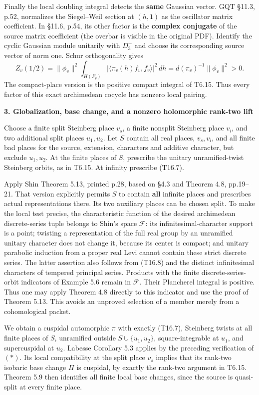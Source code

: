 Finally the local doubling integral detects the \textbf{same} Gaussian vector. GQT §11.3, p.52, normalizes the Siegel--Weil section at \((h,1)\) as the oscillator matrix coefficient. In §11.6, p.54, its other factor is the \textbf{complex conjugate} of the source matrix coefficient (the overbar is visible in the original PDF). Identify the cyclic Gaussian module unitarily with \(D_3^-\) and choose its corresponding source vector of norm one. Schur orthogonality gives \[
Z_v(1/2)=\|\phi_v\|^2\int_{H(F_v)}
       |\langle\pi_v(h)f_v,f_v\rangle|^2\,dh
       =d(\pi_v)^{-1}\|\phi_v\|^2>0.
\tag{T16.9}
\] The compact-place version is the positive compact integral of T6.15. Thus every factor of this exact archimedean cocycle has nonzero local pairing.

\textbf{3. Globalization, base change, and a nonzero holomorphic rank-two lift}

Choose a finite split Steinberg place \(v_s\), a finite nonsplit Steinberg place \(v_i\), and two additional split places \(u_1,u_2\). Let \(S\) contain all real places, \(v_s,v_i\), and all finite bad places for the source, extension, characters and additive character, but exclude \(u_1,u_2\). At the finite places of \(S\), prescribe the unitary unramified-twist Steinberg orbits, as in T6.15. At infinity prescribe (T16.7).

Apply Shin Theorem 5.13, printed p.28, based on §4.3 and Theorem 4.8, pp.19--21. That version explicitly permits \(S\) to contain \textbf{all} infinite places and prescribes actual representations there. Its two auxiliary places can be chosen split. To make the local test precise, the characteristic function of the desired archimedean discrete-series tuple belongs to Shin's space \(\mathcal F\): its infinitesimal-character support is a point; twisting a representation of the full real group by an unramified unitary character does not change it, because its center is compact; and unitary parabolic induction from a proper real Levi cannot contain these strict discrete series. The latter assertion also follows from (T16.8) and the distinct infinitesimal characters of tempered principal series. Products with the finite discrete-series-orbit indicators of Example 5.6 remain in \(\mathcal F\). Their Plancherel integral is positive. Thus one may apply Theorem 4.8 directly to this indicator and use the proof of Theorem 5.13. This avoids an unproved selection of a member merely from a cohomological packet.

We obtain a cuspidal automorphic \(\pi\) with exactly (T16.7), Steinberg twists at all finite places of \(S\), unramified outside \(S\cup\{u_1,u_2\}\), square-integrable at \(u_1\), and supercuspidal at \(u_2\). Labesse Corollary 5.3 applies by the preceding verification of \((*)\). Its local compatibility at the split place \(v_s\) implies that its rank-two isobaric base change \(\Pi\) is cuspidal, by exactly the rank-two argument in T6.15. Theorem 5.9 then identifies all finite local base changes, since the source is quasi-split at every finite place.

